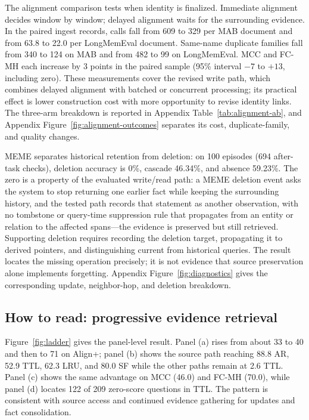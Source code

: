 The alignment comparison tests when identity is finalized. Immediate alignment decides window by window; delayed alignment waits for the surrounding evidence. In the paired ingest records, calls fall from 609 to 329 per MAB document and from 63.8 to 22.0 per LongMemEval document. Same-name duplicate families fall from 340 to 124 on MAB and from 482 to 99 on LongMemEval. MCC and FC-MH each increase by 3 points in the paired sample (95\% interval $-7$ to $+13$, including zero). These measurements cover the revised write path, which combines delayed alignment with batched or concurrent processing; its practical effect is lower construction cost with more opportunity to revise identity links. The three-arm breakdown is reported in Appendix Table~\ref{tab:alignment-ab}, and Appendix Figure~\ref{fig:alignment-outcomes} separates its cost, duplicate-family, and quality changes.

MEME separates historical retention from deletion: on 100 episodes (694 after-task checks), deletion accuracy is 0\%, cascade 46.34\%, and absence 59.23\%. The zero is a property of the evaluated write/read path: a MEME deletion event asks the system to stop returning one earlier fact while keeping the surrounding history, and the tested path records that statement as another observation, with no tombstone or query-time suppression rule that propagates from an entity or relation to the affected spans---the evidence is preserved but still retrieved. Supporting deletion requires recording the deletion target, propagating it to derived pointers, and distinguishing current from historical queries. The result locates the missing operation precisely; it is not evidence that source preservation alone implements forgetting. Appendix Figure~\ref{fig:diagnostics} gives the corresponding update, neighbor-hop, and deletion breakdown.

\subsection{How to read: progressive evidence retrieval}
\label{sec:ladder}
\label{sec:relational-benchmark}

Figure~\ref{fig:ladder} gives the panel-level result. Panel (a) rises from about 33 to 40 and then to 71 on Align+; panel (b) shows the source path reaching 88.8 AR, 52.9 TTL, 62.3 LRU, and 80.0 SF while the other paths remain at 2.6 TTL. Panel (c) shows the same advantage on MCC (46.0) and FC-MH (70.0), while panel (d) locates 122 of 209 zero-score questions in TTL. The pattern is consistent with source access and continued evidence gathering for updates and fact consolidation.

